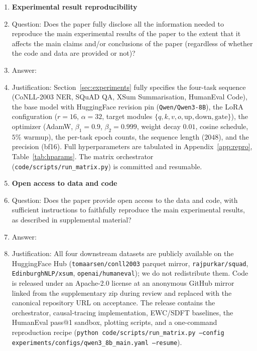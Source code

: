 \begin{enumerate}
\item {\bf Experimental result reproducibility}
    \item[] Question: Does the paper fully disclose all the information needed to reproduce the main experimental results of the paper to the extent that it affects the main claims and/or conclusions of the paper (regardless of whether the code and data are provided or not)?
    \item[] Answer: \answerYes{}
    \item[] Justification: Section~\ref{sec:experiments} fully specifies the four-task sequence (CoNLL-2003 NER, SQuAD QA, XSum Summarisation, HumanEval Code), the base model with HuggingFace revision pin (\texttt{Qwen/Qwen3-8B}), the LoRA configuration ($r{=}16$, $\alpha{=}32$, target modules $\{q,k,v,o,\text{up},\text{down},\text{gate}\}$), the optimizer (AdamW, $\beta_1{=}0.9$, $\beta_2{=}0.999$, weight decay $0.01$, cosine schedule, $5\%$ warmup), the per-task epoch counts, the sequence length ($2048$), and the precision (bf16). Full hyperparameters are tabulated in Appendix~\ref{app:repro}, Table~\ref{tab:hparams}. The matrix orchestrator (\texttt{code/scripts/run\_matrix.py}) is committed and resumable.

\item {\bf Open access to data and code}
    \item[] Question: Does the paper provide open access to the data and code, with sufficient instructions to faithfully reproduce the main experimental results, as described in supplemental material?
    \item[] Answer: \answerYes{}
    \item[] Justification: All four downstream datasets are publicly available on the HuggingFace Hub (\texttt{tomaarsen/conll2003} parquet mirror, \texttt{rajpurkar/squad}, \texttt{EdinburghNLP/xsum}, \texttt{openai/humaneval}); we do not redistribute them. Code is released under an Apache-2.0 license at an anonymous GitHub mirror linked from the supplementary zip during review and replaced with the canonical repository URL on acceptance. The release contains the orchestrator, causal-tracing implementation, EWC/SDFT baselines, the HumanEval pass@1 sandbox, plotting scripts, and a one-command reproduction recipe (\texttt{python code/scripts/run\_matrix.py --config experiments/configs/qwen3\_8b\_main.yaml --resume}).


\end{enumerate}
